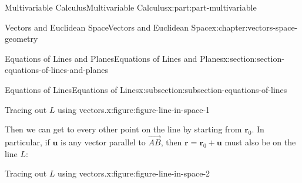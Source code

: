 \documentclass[twoside,10pt,]{tufte-book}
\numberwithin{equation}{part}
\begin{document}
\begin{partptx}{Multivariable Calculus}{}{Multivariable Calculus}{}{}{x:part:part-multivariable}
\begin{chapterptx}{Vectors and Euclidean Space}{}{Vectors and Euclidean Space}{}{}{x:chapter:vectors-space-geometry}
\begin{sectionptx}{Equations of Lines and Planes}{}{Equations of Lines and Planes}{}{}{x:section:section-equations-of-lines-and-planes}
\begin{subsectionptx}{Equations of Lines}{}{Equations of Lines}{}{}{x:subsection:subsection-equations-of-lines}
\begin{figureptx}{Tracing out \(L\) using vectors.}{x:figure:figure-line-in-space-1}{}
\begin{image}{0.05}{0.9}{0.05}
{
}%
\end{image}%
\tcblower
\end{figureptx}%
Then we can get to every other point on the line by starting from \(\mathbf{r}_{0}\). In particular, if \(\mathbf{u}\) is any vector parallel to \(\vec{AB}\), then \(\mathbf{r} = \mathbf{r}_{0}+\mathbf{u}\) must also be on the line \(L\):%
\begin{figureptx}{Tracing out \(L\) using vectors.}{x:figure:figure-line-in-space-2}{}%
\begin{image}{0.05}{0.9}{0.05}%
\end{image}
\end{figureptx}
\end{subsectionptx}
\end{sectionptx}
\end{chapterptx}
\end{partptx}
\end{document}
